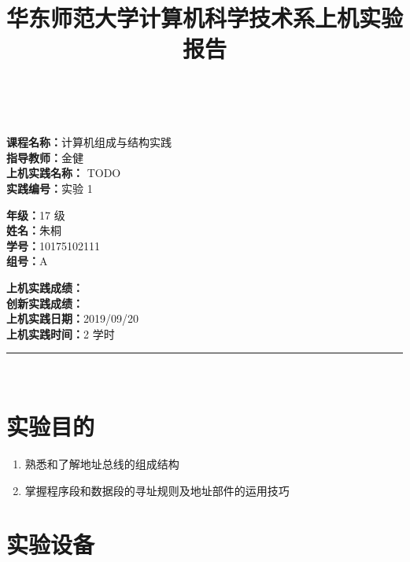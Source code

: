 \documentclass[a4paper,10pt,UTF8]{paper}
\title{华东师范大学计算机科学技术系上机实验报告}
\numberwithin{equation}{section}
\numberwithin{figure}{section}
\begin{document}
\pagestyle{fancy}
\lhead{}
\rhead{}
\makeatletter
\def\headrule{{\if@fancyplain\let\headrulewidth\plainheadrulewidth\fi%
\color{gray}\hrule\@height 0.2pt\@width\headwidth}
  \vspace{6mm}}
\makeatother

\newcommand{\HRule}{\rule{\linewidth}{1mm}}
\newcommand{\dai}{\textbf{Dais-CMX16$^+$}}

{ \\ [0.8cm]

\small{
  \begin{minipage}[t]{.32\linewidth}
    \textbf{课程名称：}计算机组成与结构实践\\
    \textbf{指导教师：}金健\\
    \textbf{上机实践名称：} TODO\\
    \textbf{实践编号：}实验 1
  \end{minipage}
  \begin{minipage}[t]{.32\linewidth}
    \textbf{年级：}17 级\\
    \textbf{姓名：}朱桐\\
    \textbf{学号：}10175102111\\
    \textbf{组号：}A
  \end{minipage} 
  \begin{minipage}[t]{.32\linewidth}
    \textbf{上机实践成绩：} \\
    \textbf{创新实践成绩：} \\
    \textbf{上机实践日期：}2019/09/20\\
    \textbf{上机实践时间：}2 学时\\
  \end{minipage}
}
\HRule \\[0.5cm]
}
\section{实验目的}

\begin{enumerate}
    \item 熟悉和了解地址总线的组成结构
    \item 掌握程序段和数据段的寻址规则及地址部件的运用技巧
    
\end{enumerate}

\section{实验设备}
\end{document}
